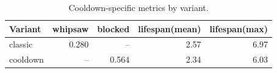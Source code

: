 \begin{table}[H]
\centering
\small
\begin{tabular}{lrrrr}
\toprule
Variant & whipsaw & blocked & lifespan(mean) & lifespan(max) \\
\midrule
classic & 0.280 & -- & 2.57 & 6.97 \\
cooldown & -- & 0.564 & 2.34 & 6.03 \\
\bottomrule
\end{tabular}
\caption{Cooldown-specific metrics by variant.}
\label{tab:cooldown_metrics}
\end{table}